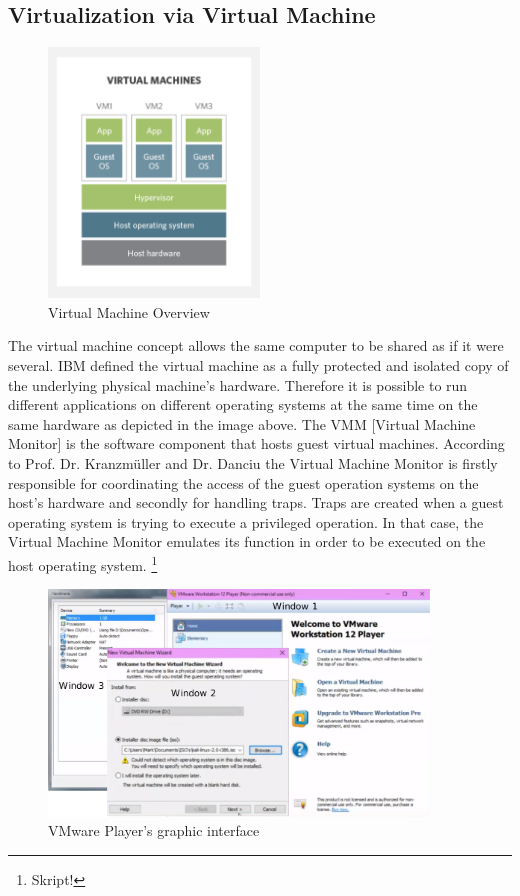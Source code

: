\documentclass[utf8,biblatex, ngerman, english]{lni}
\begin{document}
\subsection{Virtualization via Virtual Machine}

\begin{figure}
  \centering
  \includegraphics[width=0.5\textwidth]{VM.pdf}
  \caption{Virtual Machine Overview}
  \label{img:vm}
\end{figure}


\glqq The virtual machine concept allows the same computer to be shared as if it were several. IBM defined the virtual machine as a fully protected and isolated copy of the underlying physical machine’s hardware. \cite{Ss01} 
Therefore it is possible to run different applications on different operating systems at the same time on the same hardware as depicted in the image above. \glqq The VMM [Virtual Machine Monitor] is the software component that hosts guest virtual machines.\glqq \cite{Ss01} According to Prof. Dr. Kranzmüller and Dr. Danciu the Virtual Machine Monitor is firstly responsible for coordinating the access of the guest operation systems on the host's hardware and secondly for handling traps. Traps are created when a guest operating system is trying to execute a privileged operation. In that case, the Virtual Machine Monitor emulates its function in order to be executed on the host operating system. \footnote{Skript!}

\begin{figure}
  \centering
  \includegraphics[width=0.9\textwidth]{VMware Player.pdf}
  \caption{VMware Player's graphic interface}
  \label{img:VMwarePlayer}
\end{figure}
\end{document}

